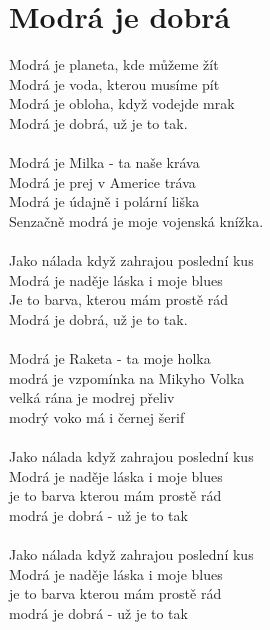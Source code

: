 \section{Modrá je dobrá}
Modrá je planeta, kde můžeme žít\\
Modrá je voda, kterou musíme pít\\
Modrá je obloha, když vodejde mrak\\
Modrá je dobrá, už je to tak.\\
\\
Modrá je Milka - ta naše kráva\\
Modrá je prej v Americe tráva\\
Modrá je údajně i polární liška\\
Senzačně modrá je moje vojenská knížka.\\
\\
Jako nálada když zahrajou poslední kus\\
Modrá je naděje láska i moje blues\\
Je to barva, kterou mám prostě rád\\
Modrá je dobrá, už je to tak.\\
\\
Modrá je Raketa - ta moje holka\\
modrá je vzpomínka na Mikyho Volka\\
velká rána je modrej přeliv\\
modrý voko má i černej šerif\\
\\
Jako nálada když zahrajou poslední kus\\
Modrá je naděje láska i moje blues\\
je to barva kterou mám prostě rád\\
modrá je dobrá - už je to tak\\
\\
Jako nálada když zahrajou poslední kus\\
Modrá je naděje láska i moje blues\\
je to barva kterou mám prostě rád\\
modrá je dobrá - už je to tak\\